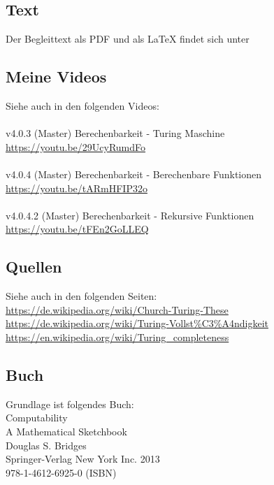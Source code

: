 \documentclass[a4paper]{amsart}
\theoremstyle{definition}
\begin{document}
\subsection*{Text}
Der Begleittext als PDF und als LaTeX findet sich unter
{\tiny
   \url{}
}

\subsection*{Meine Videos}
Siehe auch in den folgenden Videos:\\
\\
v4.0.3 (Master) Berechenbarkeit - Turing Maschine\\
\url{https://youtu.be/29UcyRumdFo}\\
\\
v4.0.4 (Master) Berechenbarkeit - Berechenbare Funktionen\\
\url{https://youtu.be/tARmHFIP32o}\\
\\
v4.0.4.2 (Master) Berechenbarkeit - Rekursive Funktionen\\
\url{https://youtu.be/tFEn2GoLLEQ}

\subsection*{Quellen}
Siehe auch in den folgenden Seiten:\\
\url{https://de.wikipedia.org/wiki/Church-Turing-These}\\
\url{https://de.wikipedia.org/wiki/Turing-Vollst%C3%A4ndigkeit}\\
\url{https://en.wikipedia.org/wiki/Turing_completeness}

\subsection*{Buch}
Grundlage ist folgendes Buch:\\
Computability\\
A Mathematical Sketchbook\\
Douglas S. Bridges\\
Springer-Verlag New York Inc. 2013\\
978-1-4612-6925-0 (ISBN)
\end{document}
